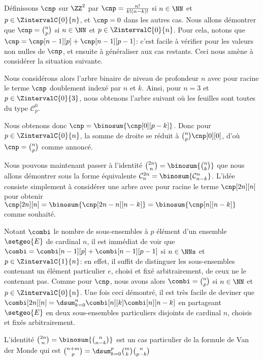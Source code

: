 Définissons $\cnp$ sur $\ZZ^2$ par
$\cnp = \frac{n!}{k!(n-k)!}$ si $n \in \NN$ et $p \in \ZintervalC{0}{n}$,
et
$\cnp = 0$ dans les autres cas.
%
Nous allons démontrer que $\cnp = \binom{n}{p}$ si $n \in \NN$ et $p \in \ZintervalC{0}{n}$.
%
Pour cela, notons que $\cnp = \cnp[n-1][p] + \cnp[n-1][p-1]$:
c'est facile à vérifier pour les valeurs non nulles de $\cnp$, et ensuite à généraliser aux cas restants.
Ceci nous amène à considérer la situation suivante.

\explaintree{\cnp}{\cnp[n-1][p]}{\cnp[n-1][p-1]}%
            {\factobinomintertree}{}

Nous considérons alors l'arbre binaire de niveau de profondeur $n$ avec pour racine le terme $\cnp$ doublement indexé par $n$ et $k$.
Ainsi, pour $n=3$ et $p \in \ZintervalC{0}{3}$, nous obtenons l'arbre suivant où les feuilles sont toutes du type $\mathcal{C}^0_p$.


Nous obtenons donc
$\cnp = \binosum{\cnp[0][p-k]}$.
Donc pour $p \in \ZintervalC{0}{n}$, la somme de droite se réduit à $\binom{n}{p} \cnp[0][0]$, d'où $\cnp = \binom{n}{p}$ comme annoncé.




Nous pouvons maintenant passer à l'identité
$\binom{2n}{n} = \binosum{\binom{n}{k}}$ que nous allons démontrer sous la forme équivalente
$\mathcal{C}^{2n}_n = \binosum{\mathcal{C}^n_{n-k}}$.
L'idée consiste simplement à considérer une arbre avec pour racine le terme $\cnp[2n][n]$ pour obtenir
$\cnp[2n][n] = \binosum{\cnp[2n - n][n-k]} = \binosum{\cnp[n][n-k]}$
comme souhaité.


\begin{remark}
	Notant $\combi$ le nombre de sous-ensembles à $p$ élément d'un ensemble $\setgeo{E}$ de cardinal $n$, il est immédiat de voir que
	$\combi = \combi[n-1][p] + \combi[n-1][p-1]$ si $n \in \NNs$ et $p \in \ZintervalC{1}{n}$:
	en effet, il suffit de distinguer les sous-ensembles contenant un élément particulier $e$, choisi et fixé arbitrairement, de ceux ne le contenant pas.
	Comme pour $\cnp$, nous avons alors $\combi = \binom{n}{p}$ si $n \in \NN$ et $p \in \ZintervalC{0}{n}$.
	Une fois ceci démontré, il est très facile de deviner que 
	$\combi[2n][n] = \dsum_{k=0}^{n} \combi[n][k] \combi[n][n-k]$
	en partageant $\setgeo{E}$ en deux sous-ensembles particuliers disjoints de cardinal $n$, choisis et fixés arbitrairement.
\end{remark}


\begin{remark}
	L'identité 
	$\binom{2n}{n} = \binosum{\binom{n}{n-k}}$
	est un cas particulier de la formule de Van der Monde qui est
	$\binom{n + m}{p} = \dsum_{k=0}^p \binom{m}{k} \binom{n}{p-k}$
\end{remark}




